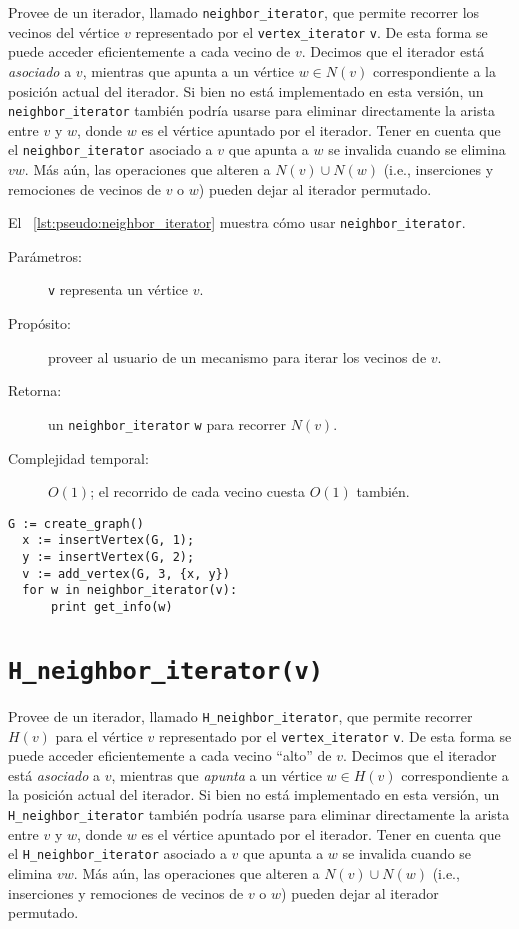 \documentclass[%
    a4paper,%
    fontsize=12pt,%
    DIV=12,
    twoside,%
    openright,%
    titlepage=true,%
    headsepline,%
    toc=bibliography,%
    parskip=half,%
    cleardoublepage=empty,%
    headings=big,%
]{scrbook}
\makeatletter
\newcommand{\Code}[2][]{\lstinline[basicstyle={\ttfamily},#1]@#2@}
\makeatother
\begin{document}
Provee de un iterador, llamado \Code{neighbor_iterator}, que permite recorrer los vecinos del vértice $v$ representado por el \Code{vertex_iterator} \Code{v}.  De esta forma se puede acceder eficientemente a cada vecino de $v$.  Decimos que el iterador está \emph{asociado} a $v$, mientras que apunta a un vértice $w \in N(v)$ correspondiente a la posición actual del iterador.  Si bien no está implementado en esta versión, un \Code{neighbor_iterator} también podría usarse para eliminar directamente la arista entre $v$ y $w$, donde $w$ es el vértice apuntado por el iterador.  Tener en cuenta que el \Code{neighbor_iterator} asociado a $v$ que apunta a $w$ se invalida cuando se elimina $vw$.  Más aún, las operaciones que alteren a $N(v) \cup N(w)$ (i.e., inserciones y remociones de vecinos de $v$ o $w$) pueden dejar al iterador permutado.

El \lstlistingname~\ref{lst:pseudo:neighbor_iterator} muestra cómo usar \Code{neighbor_iterator}.

\begin{description}
  \item [Parámetros:] \Code{v} representa un vértice $v$.
  \item [Propósito:] proveer al usuario de un mecanismo para iterar los vecinos de $v$.
  \item [Retorna:] un \Code{neighbor_iterator} \Code{w} para recorrer $N(v)$.
  \item [Complejidad temporal:] $O(1)$; el recorrido de cada vecino cuesta $O(1)$ también.
\end{description}


\begin{lstlisting}[caption={Ejemplo de uso de \Code{neighbor_iterator} para imprimir un permutación de 1,2.},gobble=2,float=ht,label={lst:pseudo:neighbor_iterator},emph={neighbor_iterator}]
  G := create_graph()
  x := insertVertex(G, 1);
  y := insertVertex(G, 2);
  v := add_vertex(G, 3, {x, y})
  for w in neighbor_iterator(v):
      print get_info(w)
\end{lstlisting}


\section{\texorpdfstring{\Code{H_neighbor_iterator(v)}}{H\_neighbor\_iterator(v)}}%
\label{sec:tad grafo:H-neighbors}

Provee de un iterador, llamado \Code{H_neighbor_iterator}, que permite recorrer $H(v)$ para el vértice $v$ representado por el \Code{vertex_iterator} \Code{v}.  De esta forma se puede acceder eficientemente a cada vecino ``alto'' de $v$.  Decimos que el iterador está \emph{asociado} a $v$, mientras que \emph{apunta} a un vértice $w \in H(v)$ correspondiente a la posición actual del iterador.  Si bien no está implementado en esta versión, un \Code{H_neighbor_iterator} también podría usarse para eliminar directamente la arista entre $v$ y $w$, donde $w$ es el vértice apuntado por el iterador.  Tener en cuenta que el \Code{H_neighbor_iterator} asociado a $v$ que apunta a $w$ se invalida cuando se elimina $vw$.  Más aún, las operaciones que alteren a $N(v) \cup N(w)$ (i.e., inserciones y remociones de vecinos de $v$ o $w$) pueden dejar al iterador permutado.
\end{document}
